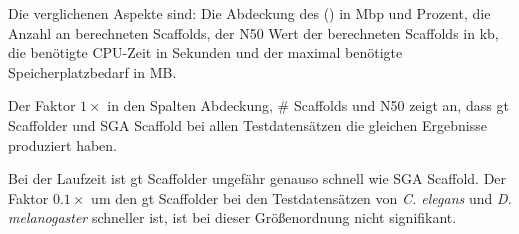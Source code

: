 \documentclass[a4paper,10pt,parskip]{scrartcl}
\begin{document}
\begin{table}
  \caption{\label{tab: Vergleich}Vergleich der Ergebnisse, der
    Laufzeit und des Speicherplatzbedarfs von gt Scaffolder und
    SGA-Scaffold.}
\end{table}

Die verglichenen Aspekte sind: Die Abdeckung des () in Mbp und Prozent, die Anzahl an
berechneten Scaffolds, der N50 Wert der berechneten Scaffolds in kb,
die benötigte CPU-Zeit in Sekunden und der maximal benötigte
Speicherplatzbedarf in MB.

Der Faktor $1\times$ in den Spalten Abdeckung, \# Scaffolds und N50
zeigt an, dass gt Scaffolder und SGA Scaffold bei allen
Testdatensätzen die gleichen Ergebnisse produziert haben.

Bei der Laufzeit ist gt Scaffolder ungefähr genauso schnell wie SGA Scaffold. Der Faktor
$0.1\times$ um den gt Scaffolder bei den Testdatensätzen von
\textit{C. elegans} und \textit{D. melanogaster} schneller ist, ist
bei dieser Größenordnung nicht signifikant.
\end{document}
